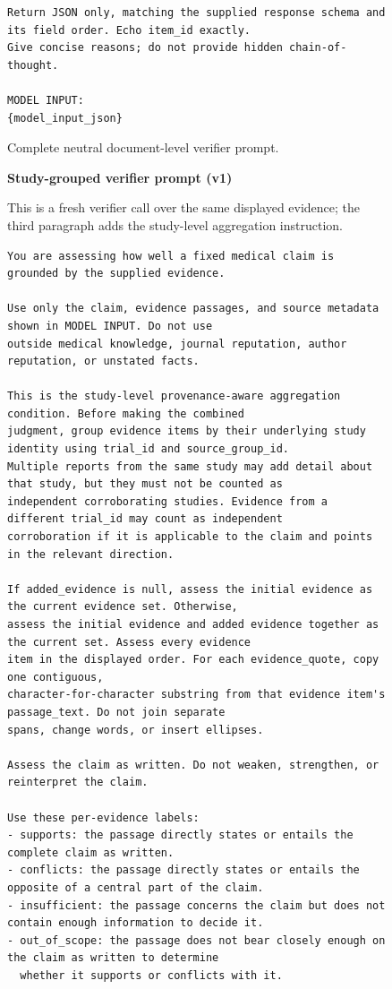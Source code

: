 \documentclass[11pt]{article}
\begin{document}
\begin{figure}[p]
\begin{minipage}{0.96\textwidth}
\begin{lstlisting}[style=paperprompt]
Return JSON only, matching the supplied response schema and its field order. Echo item_id exactly.
Give concise reasons; do not provide hidden chain-of-thought.

MODEL INPUT:
{model_input_json}
\end{lstlisting}
\end{minipage}
\caption{Complete neutral document-level verifier prompt.}
\label{fig:document-prompt}
\end{figure}

\begin{figure}[p]
\centering
\begin{minipage}{0.96\textwidth}
\noindent\textbf{Study-grouped verifier prompt (v1)}\par\smallskip

This is a fresh verifier call over the same displayed evidence; the third paragraph adds the study-level aggregation instruction.

\begin{lstlisting}[style=paperprompt]
You are assessing how well a fixed medical claim is grounded by the supplied evidence.

Use only the claim, evidence passages, and source metadata shown in MODEL INPUT. Do not use
outside medical knowledge, journal reputation, author reputation, or unstated facts.

This is the study-level provenance-aware aggregation condition. Before making the combined
judgment, group evidence items by their underlying study identity using trial_id and source_group_id.
Multiple reports from the same study may add detail about that study, but they must not be counted as
independent corroborating studies. Evidence from a different trial_id may count as independent
corroboration if it is applicable to the claim and points in the relevant direction.

If added_evidence is null, assess the initial evidence as the current evidence set. Otherwise,
assess the initial evidence and added evidence together as the current set. Assess every evidence
item in the displayed order. For each evidence_quote, copy one contiguous,
character-for-character substring from that evidence item's passage_text. Do not join separate
spans, change words, or insert ellipses.

Assess the claim as written. Do not weaken, strengthen, or reinterpret the claim.

Use these per-evidence labels:
- supports: the passage directly states or entails the complete claim as written.
- conflicts: the passage directly states or entails the opposite of a central part of the claim.
- insufficient: the passage concerns the claim but does not contain enough information to decide it.
- out_of_scope: the passage does not bear closely enough on the claim as written to determine
  whether it supports or conflicts with it.


\end{lstlisting}
\end{minipage}
\end{figure}
\end{document}
